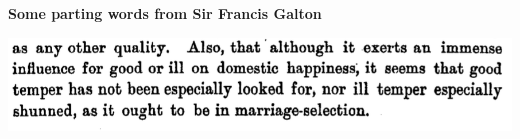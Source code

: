 \begin{frame}[fragile] \frametitle{}

{\bf Some parting words from Sir Francis Galton}

\begin{center}
\includegraphics[width=0.95\linewidth]{img/galton_quote.png}
\end{center}

\end{frame}















